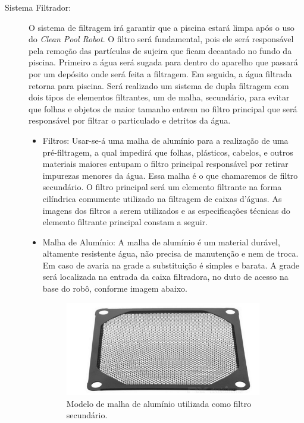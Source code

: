 \begin{description}
\item[Sistema Filtrador:] O sistema de filtragem irá garantir que a piscina
estará limpa após o uso do \textit{Clean Pool Robot}. O filtro será fundamental,
pois ele será responsável pela remoção das partículas de sujeira que ficam decantado
no fundo da piscina. Primeiro a água será sugada para dentro do aparelho que passará por
um depósito onde será feita a filtragem. Em seguida, a água filtrada retorna para
piscina. Será realizado um sistema de dupla filtragem com dois tipos de elementos
filtrantes, um de malha, secundário, para evitar que folhas e objetos de maior
tamanho entrem no filtro principal que será responsável por filtrar o particulado
e detritos da água.
\begin{itemize}
  \item Filtros: Usar-se-á uma malha de alumínio para a realização de uma
  pré-filtragem, a qual impedirá que folhas, plásticos, cabelos, e outros
  materiais maiores entupam o filtro principal responsável por retirar impurezas
  menores da água. Essa malha é o que chamaremos de filtro secundário. O filtro
  principal será um elemento filtrante na forma cilíndrica comumente utilizado
  na filtragem de caixas d’águas. As imagens dos filtros a serem utilizados e as
  especificações técnicas do elemento filtrante principal constam a seguir.
  \item Malha de Alumínio: A malha de alumínio é um material durável, altamente
  resistente água, não precisa de manutenção e nem de troca. Em caso de avaria na
  grade a substituição é simples e barata. A grade será localizada na entrada
  da caixa filtradora, no duto de acesso na base do robô, conforme imagem abaixo.
  \par
  \begin{figure}[h]
    \centering
    \includegraphics[width=0.9\textwidth]{figures/mesh-aluminium.png}
    \caption{Modelo de malha de alumínio utilizada como filtro secundário. \cite{dx2016}}
    \label{fig:mesh-aluminium}

\end{figure}
\end{itemize}
\end{description}
